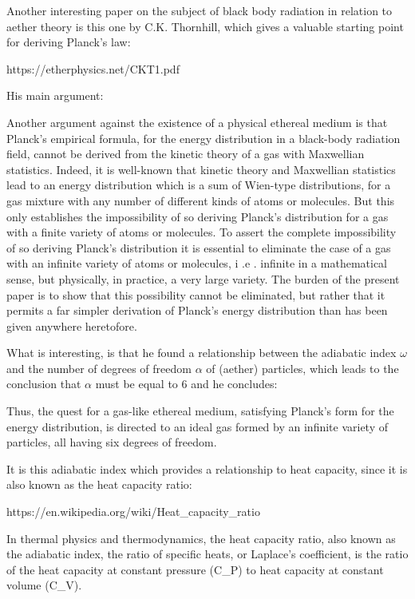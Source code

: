 \documentclass{article}
\begin{document}
Another interesting paper on the subject of black body radiation in relation to aether theory is this one by C.K.
Thornhill, which gives a valuable starting point for deriving Planck's law:

https://etherphysics.net/CKT1.pdf 

His main argument:

{\textquotedbl}Another argument against the existence of a physical ethereal medium is that Planck's empirical formula,
for the energy distribution in a black-body radiation field, cannot be derived from the kinetic theory of a gas with
Maxwellian statistics. Indeed, it is well-known that kinetic theory and Maxwellian statistics lead to an energy
distribution which is a sum of Wien-type distributions, for a gas mixture with any number of different kinds of atoms
or molecules. But this only establishes the impossibility of so deriving Planck's distribution for a gas with a finite
variety of atoms or molecules. To assert the complete impossibility of so deriving Planck's distribution it is
essential to eliminate the case of a gas with an infinite variety of atoms or molecules, i .e . infinite in a
mathematical sense, but physically, in practice, a very large variety. The burden of the present paper is to show that
this possibility cannot be eliminated, but rather that it permits a far simpler derivation of Planck's energy
distribution than has been given anywhere heretofore.{\textquotedbl}

What is interesting, is that he found a relationship between the adiabatic index $\omega $ and the number of degrees of
freedom $\alpha $ of (aether) particles, which leads to the conclusion that $\alpha $ must be equal to 6 and he
concludes:

{\textquotedbl}Thus, the quest for a gas-like ethereal medium, satisfying Planck's form for the energy distribution, is
directed to an ideal gas formed by an infinite variety of particles, all having six degrees of freedom.{\textquotedbl}

It is this adiabatic index which provides a relationship to heat capacity, since it is also known as the heat capacity
ratio:

https://en.wikipedia.org/wiki/Heat\_capacity\_ratio 

{\textquotedbl}In thermal physics and thermodynamics, the heat capacity ratio, also known as the adiabatic index, the
ratio of specific heats, or Laplace's coefficient, is the ratio of the heat capacity at constant pressure (C\_P) to
heat capacity at constant volume (C\_V).{\textquotedbl}
\end{document}
